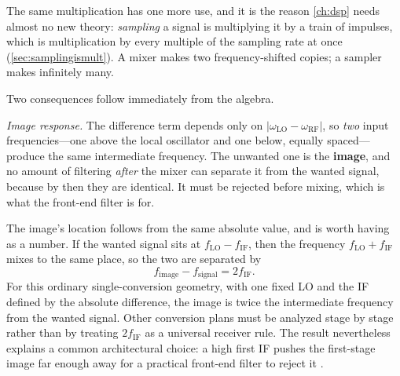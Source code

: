 The same multiplication has one more use, and it is the reason \cref{ch:dsp} needs
almost no new theory: \emph{sampling} a signal is multiplying it by a train of
impulses, which is multiplication by every multiple of the sampling rate at once
(\cref{sec:samplingismult}). A mixer makes two frequency-shifted copies; a sampler
makes infinitely many.

Two consequences follow immediately from the algebra.

\emph{Image response.} The difference term depends only on
\(|\omega_{\text{LO}}-\omega_{\text{RF}}|\), so \emph{two} input frequencies---one
above the local oscillator and one below, equally spaced---produce the same
intermediate frequency. The unwanted one is the \textbf{image}, and no amount of
filtering \emph{after} the mixer can separate it from the wanted signal, because by
then they are identical. It must be rejected before mixing, which is what the front-end
filter is for.

The image's location follows from the same absolute value, and is worth having as a
number. If the wanted signal sits at \(f_{\text{LO}}-f_{\text{IF}}\), then the
frequency \(f_{\text{LO}}+f_{\text{IF}}\) mixes to the same place, so the two are
separated by
\[
f_{\text{image}}-f_{\text{signal}}=2f_{\text{IF}} .
\]
For this ordinary single-conversion geometry, with one fixed LO and the IF defined by
the absolute difference, the image is twice the intermediate frequency from the
wanted signal. Other conversion plans must be analyzed stage by stage rather than by
treating \(2f_{\mathrm{IF}}\) as a universal receiver rule. The result nevertheless
explains a common architectural choice: a high first IF pushes the first-stage image
far enough away for a practical front-end filter to reject it
\cite[pp.~289--317]{davis2011rfcircuit}.

